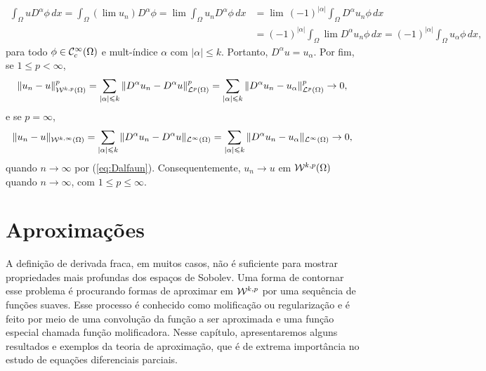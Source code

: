\begin{prf}
\[\begin{aligned}
            \int_\Omega u D^\alpha \phi \, dx 
            = \int_\Omega (\lim u_n) D^\alpha \phi 
            = \lim\! \int_\Omega u_n D^\alpha \phi \,dx
            &= \lim\, (-1)^{|\alpha|}\!\int_\Omega  D^\alpha u_n \phi\,dx \\
            &= (-1)^{|\alpha|}\!\int_\Omega \lim D^\alpha u_n \phi \,dx 
            = (-1)^{|\alpha|}\!\int_\Omega u_\alpha \phi \,dx,
        \end{aligned}
    \]
    para todo $\phi \in \mathcal{C}^{\infty}_c(\Omega)$ e mult-índice $\alpha$ com $|\alpha| \leqslant k$.
    Portanto, $D^\alpha u = u_\alpha$.
    Por fim, se $1 \leqslant p < \infty$,
    \[
        \Vert u_n - u \Vert_{\mathcal{W}^{k,p}(\Omega)}^p = \sum_{|\alpha| \leqslant k} \Vert D^\alpha u_n - D^\alpha u \Vert_{\mathcal{L}^p(\Omega)}^p = \sum_{|\alpha| \leqslant k} \Vert D^\alpha u_n - u_\alpha \Vert_{\mathcal{L}^p(\Omega)}^p \to 0,
    \]
    e se $p = \infty$,
    \[
        \Vert u_n - u \Vert_{\mathcal{W}^{k,\infty}(\Omega)} = \sum_{|\alpha| \leqslant k} \Vert D^\alpha u_n - D^\alpha u \Vert_{\mathcal{L}^\infty(\Omega)} = \sum_{|\alpha| \leqslant k} \Vert D^\alpha u_n - u_\alpha \Vert_{\mathcal{L}^\infty(\Omega)} \to 0,
    \]
    quando $n \to \infty$ por (\ref{eq:Dalfaun}).
    Consequentemente, $u_n \to u$ em $\mathcal{W}^{k,p}(\Omega)$ quando $n \to \infty$, com $1 \leqslant p \leqslant \infty$.
\end{prf}

\section{Aproximações} \label{sec:aproximacoes}


A definição de derivada fraca, em muitos casos, não é suficiente para mostrar propriedades mais profundas dos espaços de Sobolev.
Uma forma de contornar esse problema é procurando formas de aproximar em $\mathcal{W}^{k,p}$ por uma sequência de funções suaves.
Esse processo é conhecido como molificação ou regularização e é feito por meio de uma convolução da função a ser aproximada e uma função especial chamada função molificadora. 
Nesse capítulo, apresentaremos alguns resultados e exemplos da teoria de aproximação, que é de extrema importância no estudo de equações diferenciais parciais.

